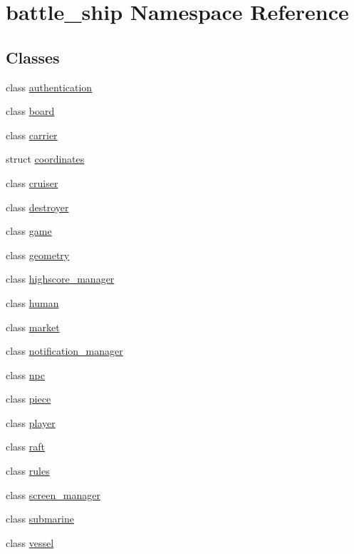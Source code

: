 \hypertarget{namespacebattle__ship}{}\section{battle\+\_\+ship Namespace Reference}
\label{namespacebattle__ship}
\subsection*{Classes}
\begin{DoxyCompactItemize}
\item 
class \hyperlink{classbattle__ship_1_1authentication}{authentication}
\item 
class \hyperlink{classbattle__ship_1_1board}{board}
\item 
class \hyperlink{classbattle__ship_1_1carrier}{carrier}
\item 
struct \hyperlink{structbattle__ship_1_1coordinates}{coordinates}
\item 
class \hyperlink{classbattle__ship_1_1cruiser}{cruiser}
\item 
class \hyperlink{classbattle__ship_1_1destroyer}{destroyer}
\item 
class \hyperlink{classbattle__ship_1_1game}{game}
\item 
class \hyperlink{classbattle__ship_1_1geometry}{geometry}
\item 
class \hyperlink{classbattle__ship_1_1highscore__manager}{highscore\+\_\+manager}
\item 
class \hyperlink{classbattle__ship_1_1human}{human}
\item 
class \hyperlink{classbattle__ship_1_1market}{market}
\item 
class \hyperlink{classbattle__ship_1_1notification__manager}{notification\+\_\+manager}
\item 
class \hyperlink{classbattle__ship_1_1npc}{npc}
\item 
class \hyperlink{classbattle__ship_1_1piece}{piece}
\item 
class \hyperlink{classbattle__ship_1_1player}{player}
\item 
class \hyperlink{classbattle__ship_1_1raft}{raft}
\item 
class \hyperlink{classbattle__ship_1_1rules}{rules}
\item 
class \hyperlink{classbattle__ship_1_1screen__manager}{screen\+\_\+manager}
\item 
class \hyperlink{classbattle__ship_1_1submarine}{submarine}
\item 
class \hyperlink{classbattle__ship_1_1vessel}{vessel}
\end{DoxyCompactItemize}
